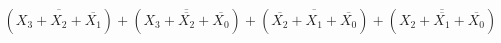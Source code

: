 \documentclass[preview]{standalone}
\begin{document}
\begin{align*}
\left(\overline{X_3+X_2+\overline{X_1}}\right)+\left(\overline{X_3+\overline{X_2}+\overline{X_0}}\right)+\left(\overline{\overline{X_2}+X_1+\overline{X_0}}\right)+\left(\overline{X_2+\overline{X_1}+\overline{X_0}}\right)
\end{align*}
\end{document}
